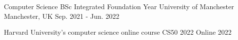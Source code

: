 


\begin{cventries}

  \cventry
    {Computer Science BSc Integrated Foundation Year} %
    {University of Manchester} %
    {Manchester, UK} %
    {Sep. 2021 - Jun. 2022} %
    {
    }
    
  \cventry
    {Harvard University's computer science online course} %
    {CS50 2022} %
    {Online} %
    {2022} %
    {
    }
\end{cventries}

